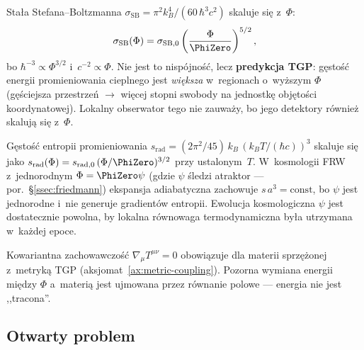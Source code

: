 \begin{remark}%
\label{rem:stefan-boltzmann}
Sta\l{}a Stefana--Boltzmanna $\sigma_{\mathrm{SB}}
= \pi^2 k_B^4 / (60\,\hbar^3 c^2)$ skaluje si\k{e} z~$\Phi$:
\begin{equation}\label{eq:sigma-SB-Phi}
  \sigma_{\mathrm{SB}}(\Phi)
  = \sigma_{\mathrm{SB},0}
    \left(\frac{\Phi}{\PhiZero}\right)^{5/2},
\end{equation}
bo $\hbar^{-3} \propto \Phi^{3/2}$ i~$c^{-2} \propto \Phi$.
Nie jest to nisp\'ojno\'s\'c, lecz \textbf{predykcja TGP}:
g\k{e}sto\'s\'c energii promieniowania cieplnego jest
\emph{wi\k{e}ksza} w~regionach o~wy\.zszym $\Phi$
(g\k{e}\'sciejsza przestrze\'n $\to$ wi\k{e}cej stopni swobody
na jednostk\k{e} obj\k{e}to\'sci koordynatowej).
Lokalny obserwator tego nie zauwa\.zy, bo jego detektory
r\'ownie\.z skaluj\k{a} si\k{e} z~$\Phi$.
\end{remark}

\begin{remark}%
\label{rem:entropy-conservation}
G\k{e}sto\'s\'c entropii promieniowania $s_{\mathrm{rad}}
= (2\pi^2/45)\,k_B\,(k_B T/(\hbar c))^3$ skaluje si\k{e} jako
$s_{\mathrm{rad}}(\Phi) = s_{\mathrm{rad},0}\,(\Phi/\PhiZero)^{3/2}$
przy ustalonym~$T$. W~kosmologii FRW z~jednorodnym $\Phi = \PhiZero\psi$
(gdzie $\psi$ \'sledzi atraktor --- por.~\S\ref{ssec:friedmann})
ekspansja adiabatyczna zachowuje $s\,a^3 = \mathrm{const}$,
bo $\psi$ jest jednorodne i~nie generuje gradient\'ow entropii.
Ewolucja kosmologiczna $\psi$ jest dostatecznie powolna,
by lokalna r\'ownowaga termodynamiczna by\l{}a utrzymana w~ka\.zdej epoce.

Kowariantna zachowawczo\'s\'c $\nabla_\mu T^{\mu\nu} = 0$
obowi\k{a}zuje dla materii sprz\k{e}\.zonej z~metryk\k{a} TGP
(aksjomat~\ref{ax:metric-coupling}). Pozorna wymiana energii
mi\k{e}dzy $\Phi$ a~materi\k{a} jest ujmowana przez r\'ownanie
polowe --- energia nie jest ,,tracona''.
\end{remark}

\subsection{Otwarty problem}\label{ssec:stale-problem}

